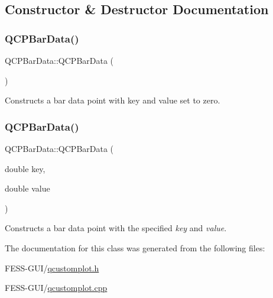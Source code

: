 \subsection{Constructor \& Destructor Documentation}
\hypertarget{class_q_c_p_bar_data_a8d214eda9ef41bc6da2a908a09623836}{}\label{class_q_c_p_bar_data_a8d214eda9ef41bc6da2a908a09623836} 
\subsubsection{\texorpdfstring{Q\+C\+P\+Bar\+Data()}{QCPBarData()}\hspace{0.1cm}{\footnotesize\ttfamily [1/2]}}
{\footnotesize\ttfamily Q\+C\+P\+Bar\+Data\+::\+Q\+C\+P\+Bar\+Data (\begin{DoxyParamCaption}{ }\end{DoxyParamCaption})}

Constructs a bar data point with key and value set to zero. \hypertarget{class_q_c_p_bar_data_ac0bb7ede5373a7b18713418fa78f972d}{}\label{class_q_c_p_bar_data_ac0bb7ede5373a7b18713418fa78f972d} 
\subsubsection{\texorpdfstring{Q\+C\+P\+Bar\+Data()}{QCPBarData()}\hspace{0.1cm}{\footnotesize\ttfamily [2/2]}}
{\footnotesize\ttfamily Q\+C\+P\+Bar\+Data\+::\+Q\+C\+P\+Bar\+Data (\begin{DoxyParamCaption}\item[{double}]{key,  }\item[{double}]{value }\end{DoxyParamCaption})}

Constructs a bar data point with the specified {\itshape key} and {\itshape value}. 

The documentation for this class was generated from the following files\+:\begin{DoxyCompactItemize}
\item 
F\+E\+S\+S-\/\+G\+U\+I/\hyperlink{qcustomplot_8h}{qcustomplot.\+h}\item 
F\+E\+S\+S-\/\+G\+U\+I/\hyperlink{qcustomplot_8cpp}{qcustomplot.\+cpp}\end{DoxyCompactItemize}
